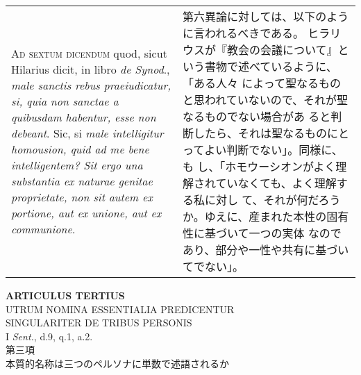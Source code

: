 \documentclass[10pt]{jsarticle} %
\begin{document}
\begin{longtable}{p{21em}p{21em}}
{\scshape Ad sextum dicendum} quod, sicut Hilarius dicit, in libro {\itshape de Synod}., {\itshape male
sanctis rebus praeiudicatur, si, quia non sanctae a quibusdam habentur,
esse non debeant}. Sic, si {\itshape male intelligitur homousion, quid ad me bene
intelligentem? Sit ergo una substantia ex naturae genitae proprietate,
non sit autem ex portione, aut ex unione, aut ex communione}.


&

第六異論に対しては、以下のように言われるべきである。
ヒラリウスが『教会の会議について』という書物で述べているように、「ある人々
 によって聖なるものと思われていないので、それが聖なるものでない場合があ
 ると判断したら、それは聖なるものにとってよい判断でない」。同様に、も
 し、「ホモウーシオンがよく理解されていなくても、よく理解する私に対し
 て、それが何だろうか。ゆえに、産まれた本性の固有性に基づいて一つの実体
 なのであり、部分や一性や共有に基づいてでない」。



\\


\end{longtable}
\newpage




\begin{center}
 {\Large {\bf ARTICULUS TERTIUS}}\\
 {\large UTRUM NOMINA ESSENTIALIA PREDICENTUR\\SINGULARITER DE TRIBUS PERSONIS}\\
 {\footnotesize I {\itshape Sent.}, d.9, q.1, a.2.}\\
 {\Large 第三項\\本質的名称は三つのペルソナに単数で述語されるか}
\end{center}
\end{document}
